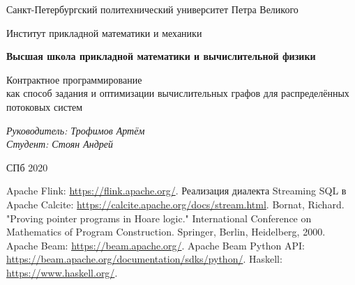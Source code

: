 \documentclass[a4paper,12pt]{article}
\begin{document}
\thispagestyle{empty}
\begin{center}
    Санкт-Петербургский политехнический университет Петра Великого

    Институт прикладной математики и механики

    \textbf{Высшая школа прикладной математики и вычислительной
    физики}
\end{center}
\vspace{13ex}

\begin{center}
    \vspace{16ex}
    \begin{spacing}{1.5}
        {\Large Контрактное программирование \\как способ задания и оптимизации вычислительных графов для распределённых потоковых систем}
    \end{spacing}
\end{center}
\vfill
\begin{flushright}
    \noindent
    \textit{Руководитель: Трофимов Артём} \\
    \textit{Студент: Стоян Андрей}
\end{flushright}
\vspace{5ex}
\begin{center}
    СПб 2020
\end{center}
\newpage

\tableofcontents
\newpage


\newpage

\newpage

\newpage

\newpage






\begin{thebibliography}{9}
     Apache Flink: \url{https://flink.apache.org/}.
     Реализация диалекта Streaming SQL в Apache Calcite: \url{https://calcite.apache.org/docs/stream.html}.
     Bornat, Richard. "Proving pointer programs in Hoare logic." International Conference on Mathematics of Program Construction. Springer, Berlin, Heidelberg, 2000.
     Apache Beam: \url{https://beam.apache.org/}.
     Apache Beam Python API: \url{https://beam.apache.org/documentation/sdks/python/}.
     Haskell: \url{https://www.haskell.org/}.
\end{thebibliography}
\end{document}
